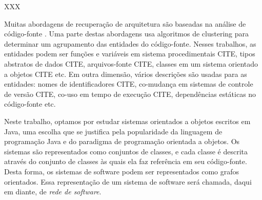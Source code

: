 \begin{section}{XXX}

Muitas abordagens de recuperação de arquitetura são baseadas na análise de código-fonte \cite{Pollet2007}. Uma parte destas abordagens usa algoritmos de clustering para determinar um agrupamento das entidades do código-fonte. Nesses trabalhos, as entidades podem ser funções e variáveis em sistema procedimentais CITE, tipos abstratos de dados CITE, arquivos-fonte CITE, classes em um sistema orientado a objetos CITE etc. Em outra dimensão, vários descrições são usadas para as entidades: nomes de identificadores CITE, co-mudança em sistemas de controle de versão CITE, co-uso em tempo de execução CITE, dependências estáticas no código-fonte etc.

Neste trabalho, optamos por estudar sistemas orientados a objetos escritos em Java, uma escolha que se justifica pela popularidade da linguagem de programação Java e do paradigma de programação orientada a objetos. Os sistemas são representados como conjuntos de classes, e cada classe é descrita através do conjunto de classes às quais ela faz referência em seu código-fonte. Desta forma, os sistemas de software podem ser representados como grafos orientados. Essa representação de um sistema de software será chamada, daqui em diante, de \emph{rede de software}.

	
\end{section}


